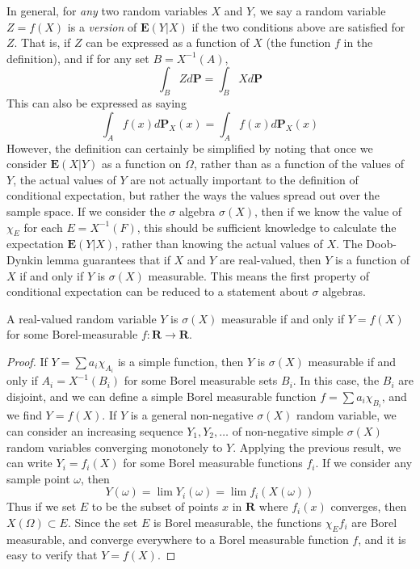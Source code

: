 In general, for {\it any} two random variables $X$ and $Y$, we say a random variable $Z = f(X)$ is a {\it version} of $\mathbf{E}(Y|X)$ if the two conditions above are satisfied for $Z$. That is, if $Z$ can be expressed as a function of $X$ (the function $f$ in the definition), and if for any set $B = X^{-1}(A)$,
%
\[ \int_B Z d\mathbf{P} = \int_B X d\mathbf{P} \]
%
This can also be expressed as saying
%
\[ \int_A f(x) d\mathbf{P}_X(x) = \int_A f(x) d\mathbf{P}_X(x) \]
%
However, the definition can certainly be simplified by noting that once we consider $\mathbf{E}(X|Y)$ as a function on $\Omega$, rather than as a function of the values of $Y$, the actual values of $Y$ are not actually important to the definition of conditional expectation, but rather the ways the values spread out over the sample space. If we consider the $\sigma$ algebra $\sigma(X)$, then if we know the value of $\chi_E$ for each $E = X^{-1}(F)$, this should be sufficient knowledge to calculate the expectation $\mathbf{E}(Y|X)$, rather than knowing the actual values of $X$. The Doob-Dynkin lemma guarantees that if $X$ and $Y$ are real-valued, then $Y$ is a function of $X$ if and only if $Y$ is $\sigma(X)$ measurable. This means the first property of conditional expectation can be reduced to a statement about $\sigma$ algebras.

\begin{lemma}
    A real-valued random variable $Y$ is $\sigma(X)$ measurable if and only if $Y = f(X)$ for some Borel-measurable $f: \mathbf{R} \to \mathbf{R}$.
\end{lemma}
\begin{proof}
    If $Y = \sum a_i \chi_{A_i}$ is a simple function, then $Y$ is $\sigma(X)$ measurable if and only if $A_i = X^{-1}(B_i)$ for some Borel measurable sets $B_i$. In this case, the $B_i$ are disjoint, and we can define a simple Borel measurable function $f = \sum a_i \chi_{B_i}$, and we find $Y = f(X)$. If $Y$ is a general non-negative $\sigma(X)$ random variable, we can consider an increasing sequence $Y_1, Y_2, \dots$ of non-negative simple $\sigma(X)$ random variables converging monotonely to $Y$. Applying the previous result, we can write $Y_i = f_i(X)$ for some Borel measurable functions $f_i$. If we consider any sample point $\omega$, then
    \[ Y(\omega) = \lim Y_i(\omega) = \lim f_i(X(\omega)) \]
    Thus if we set $E$ to be the subset of points $x$ in $\mathbf{R}$ where $f_i(x)$ converges, then $X(\Omega) \subset E$. Since the set $E$ is Borel measurable, the functions $\chi_E f_i$ are Borel measurable, and converge everywhere to a Borel measurable function $f$, and it is easy to verify that $Y = f(X)$.
\end{proof}


